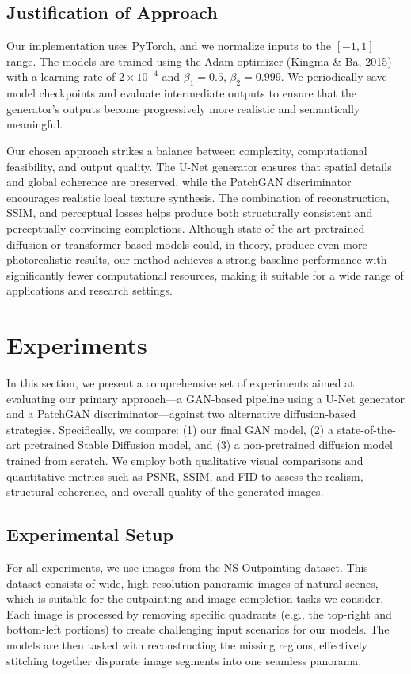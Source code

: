 \documentclass[sigconf]{acmart}
\begin{document}
\subsection*{Justification of Approach}
Our implementation uses PyTorch, and we normalize inputs to the $[-1, 1]$ range. The models are trained using the Adam optimizer (Kingma \& Ba, 2015) with a learning rate of $2 \times 10^{-4}$ and $\beta_1 = 0.5$, $\beta_2 = 0.999$. We periodically save model checkpoints and evaluate intermediate outputs to ensure that the generator’s outputs become progressively more realistic and semantically meaningful. 

Our chosen approach strikes a balance between complexity, computational feasibility, and output quality. The U-Net generator ensures that spatial details and global coherence are preserved, while the PatchGAN discriminator encourages realistic local texture synthesis. The combination of reconstruction, SSIM, and perceptual losses helps produce both structurally consistent and perceptually convincing completions. Although state-of-the-art pretrained diffusion or transformer-based models could, in theory, produce even more photorealistic results, our method achieves a strong baseline performance with significantly fewer computational resources, making it suitable for a wide range of applications and research settings.

\section{Experiments}

In this section, we present a comprehensive set of experiments aimed at evaluating our primary approach—a GAN-based pipeline using a U-Net generator and a PatchGAN discriminator—against two alternative diffusion-based strategies. Specifically, we compare: (1) our final GAN model, (2) a state-of-the-art pretrained Stable Diffusion model, and (3) a non-pretrained diffusion model trained from scratch. We employ both qualitative visual comparisons and quantitative metrics such as PSNR, SSIM, and FID to assess the realism, structural coherence, and overall quality of the generated images.

\subsection*{Experimental Setup}

For all experiments, we use images from the \textcolor{red}{\href{https://github.com/z-x-yang/NS-Outpainting}{NS-Outpainting}} dataset. This dataset consists of wide, high-resolution panoramic images of natural scenes, which is suitable for the outpainting and image completion tasks we consider. Each image is processed by removing specific quadrants (e.g., the top-right and bottom-left portions) to create challenging input scenarios for our models. The models are then tasked with reconstructing the missing regions, effectively stitching together disparate image segments into one seamless panorama.
\end{document}
